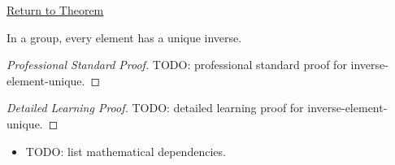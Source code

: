 \newpage
{}
\label{prf:inverse-element-unique}

\begin{remark*}[Return]
\hyperref[prop:inverse-element-unique]{Return to Theorem}
\end{remark*}

\begin{proposition*}
In a group, every element has a unique inverse.
\end{proposition*}

\begin{proof}[Professional Standard Proof]
\LRAProofBodyStart
TODO: professional standard proof for inverse-element-unique.
\end{proof}

\begin{proof}[Detailed Learning Proof]
\LRAProofBodyStart
TODO: detailed learning proof for inverse-element-unique.
\end{proof}

\begin{remark*}
\end{remark*}

\begin{dependencies}
\begin{itemize}
  \item TODO: list mathematical dependencies.
\end{itemize}
\end{dependencies}

\clearpage
